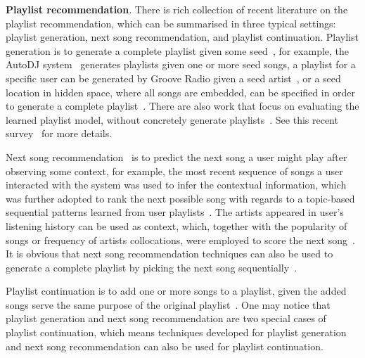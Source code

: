 {\bf Playlist recommendation}.
There is rich collection of recent literature on the playlist 
recommendation,
which can be summarised in three typical settings: 
playlist generation, next song recommendation, and playlist continuation.
Playlist generation is to generate a complete playlist given some 
seed~\cite{platt2002learning,mcfee2011natural,mcfee2012hypergraph,chen2012playlist,ben2017groove},
for example, the AutoDJ system~\cite{platt2002learning} generates playlists given one or more seed songs,
a playlist for a specific user can be generated by Groove Radio given a seed artist~\cite{ben2017groove},
or a seed location in hidden space, where all songs are embedded,
can be specified in order to generate a complete playlist~\cite{chen2012playlist}.
There are also work that focus on evaluating the learned playlist model,
without concretely generate playlists~\cite{mcfee2011natural,mcfee2012hypergraph}.
See this recent survey~\cite{bonnin2015automated} for more details.

Next song recommendation~\cite{hariri2012context,bonnin2013evaluating,jannach2015beyond}
is to predict the next song a user might play after observing some context,
for example, the most recent sequence of songs a user interacted with the system was used to
infer the contextual information, which was further adopted to rank the next possible song
with regards to a topic-based sequential patterns learned from user playlists~\cite{hariri2012context}.
The artists appeared in user's listening history can be used as context,
which, together with the popularity of songs or frequency of artists collocations,
were employed to score the next song~\cite{mcfee2012million,bonnin2013evaluating}.
It is obvious that next song recommendation techniques can also be used to generate a
complete playlist by picking the next song sequentially~\cite{bonnin2013evaluating,ben2017groove}.

Playlist continuation is to add one or more songs to a playlist,
given the added songs serve the same purpose of the original playlist~\cite{schedl2017,recsysch2018}.
One may notice that playlist generation and next song recommendation are two special cases
of playlist continuation, which means techniques developed for playlist generation and
next song recommendation can also be used for playlist continuation.


